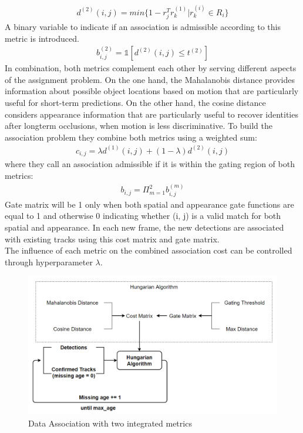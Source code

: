         \begin{align}
            d^{(2)} (i,j) = min\{1 - r_j^T r_k^{(1)} | r_k^{(i)} \in R_i\}
        \end{align}
        A binary variable to indicate if an association is admissible according to this metric is introduced.
        \begin{align}
            b_{i,j}^{(2)} = \mathbb{1} [d^{(2)} (i,j) \leq t^{(2)}]
        \end{align}
        In combination, both metrics complement each other by serving different aspects of the assignment problem. On the one hand, the Mahalanobis distance provides information about possible object locations based on motion that are particularly useful for short-term predictions. On the other hand, the cosine distance considers appearance information 
        that are particularly useful to recover identities after longterm occlusions, when motion is less discriminative. To build the association problem they combine both metrics using a weighted sum:
        \begin{align}
            c_{i,j} = \lambda d^{(1)} (i,j) + (1 - \lambda) d^{(2)} (i,j)
        \end{align}
        where they call an association admissible if it is within the gating region of both metrics:
        \begin{align}
            b_{i,j} = \Pi_{m = 1}^2 b_{i,j}^{(m)}
        \end{align}
        Gate matrix will be 1 only when both spatial and appearance gate functions are equal to 1 and otherwise 0 indicating whether (i, j) is a valid match for both spatial and appearance. In each new frame, the new detections are associated with existing tracks using this cost matrix and gate matrix. \\ 
        \vspace{3mm}
        The influence of each metric on the combined association cost can be controlled through hyperparameter $\lambda$.
        \begin{figure}[H]
            \centering
            \includegraphics[width=0.6\linewidth]{img/intergrated-metrics.png}
            \caption{Data Association with two integrated metrics}
        \end{figure}
